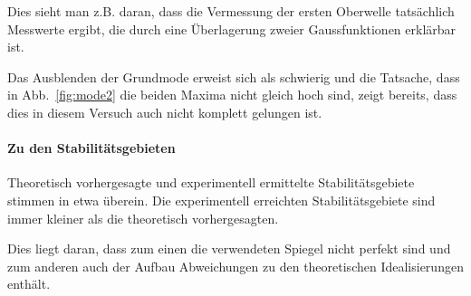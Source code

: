 Dies sieht man z.B. daran, dass die Vermessung der ersten 
Oberwelle tatsächlich Messwerte ergibt, die durch eine 
Überlagerung zweier Gaussfunktionen erklärbar ist.

Das Ausblenden der Grundmode erweist sich als schwierig und 
die Tatsache, dass in Abb.~\ref{fig:mode2} die beiden 
Maxima nicht gleich hoch sind, zeigt bereits, dass dies in diesem 
Versuch auch nicht komplett gelungen ist.

\paragraph{Zu den Stabilitätsgebieten}

Theoretisch vorhergesagte und experimentell ermittelte 
Stabilitätsgebiete stimmen in etwa überein. 
Die experimentell erreichten Stabilitätsgebiete sind immer 
kleiner als die theoretisch vorhergesagten.

Dies liegt daran, dass zum einen die verwendeten Spiegel nicht 
perfekt sind und zum anderen auch der Aufbau Abweichungen 
zu den theoretischen Idealisierungen enthält.
